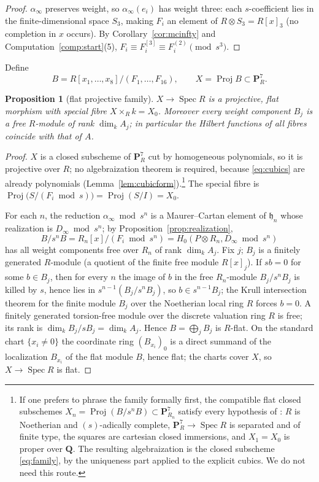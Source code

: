 \documentclass[11pt]{article}
\newtheorem{proposition}[theorem]{Proposition}
\theoremstyle{definition}
\theoremstyle{remark}
\newcommand{\QQ}{\mathbf Q}
\newcommand{\PP}{\mathbf P}
\newcommand{\Spec}{\operatorname{Spec}}
\newcommand{\Proj}{\operatorname{Proj}}
\newcommand{\h}{\mathfrak h}
\begin{document}
\begin{proof}
$\alpha_\infty$ preserves weight, so $\alpha_\infty(e_i)$ has weight three:
each $s$-coefficient lies in the finite-dimensional space $S_3$, making
$F_i$ an element of $R\otimes S_3=R[x]_3$ (no completion in $x$ occurs).
By Corollary~\ref{cor:mcinfty} and Computation~\ref{comp:start}(5),
$F_i\equiv F^{[3]}_i\equiv F^{(2)}_i\pmod{s^3}$.
\end{proof}

Define
\[
 B=R[x_1,\ldots,x_8]/(F_1,\ldots,F_{16}),
 \qquad
 X=\Proj B\subset\PP^7_R .
\tag{7.3}\label{eq:family}
\]

\begin{proposition}[flat projective family]\label{prop:flat}
$X\to\Spec R$ is a projective, flat morphism with special fibre
$X\times_Rk=X_0$.  Moreover every weight component $B_j$ is a free
$R$-module of rank $\dim_kA_j$; in particular the Hilbert functions of all
fibres coincide with that of $A$.
\end{proposition}

\begin{proof}
$X$ is a closed subscheme of $\PP^7_R$ cut by homogeneous polynomials, so
it is projective over $R$; no algebraization theorem is required, because
\eqref{eq:cubics} are already polynomials
(Lemma~\ref{lem:cubicform}).\footnote{If one prefers to phrase the family
formally first, the compatible flat closed subschemes
$X_n=\Proj(B/s^nB)\subset\PP^7_{R_n}$ satisfy every hypothesis of
\cite[Tag 0899]{Stacks0899}: $R$ is Noetherian and $(s)$-adically complete,
$\PP^7_R\to\Spec R$ is separated and of finite type, the squares are
cartesian closed immersions, and $X_1=X_0$ is proper over $\QQ$.  The
resulting algebraization is the closed subscheme \eqref{eq:family}, by the
uniqueness part applied to the explicit cubics.  We do not need this
route.}  The special fibre is
$\Proj\bigl(S/(F_i\bmod s)\bigr)=\Proj(S/I)=X_0$.

For each $n$, the reduction $\alpha_\infty\bmod s^n$ is a Maurer--Cartan
element of $\h_n$ whose realization is $D_\infty\bmod s^n$; by
Proposition~\ref{prop:realization},
\[
 B/s^nB=R_n[x]/(F_i\bmod s^n)=H_0(P\otimes R_n,D_\infty\bmod s^n)
\]
has all weight components free over $R_n$ of rank $\dim_kA_j$.  Fix $j$;
$B_j$ is a finitely generated $R$-module (a quotient of the finite free
module $R[x]_j$).  If $sb=0$ for some $b\in B_j$, then for every $n$ the
image of $b$ in the free $R_n$-module $B_j/s^nB_j$ is killed by $s$, hence
lies in $s^{n-1}(B_j/s^nB_j)$, so $b\in s^{n-1}B_j$; the Krull intersection
theorem for the finite module $B_j$ over the Noetherian local ring $R$
forces $b=0$.  A finitely generated torsion-free module over the discrete
valuation ring $R$ is free; its rank is
$\dim_k B_j/sB_j=\dim_kA_j$.  Hence $B=\bigoplus_jB_j$ is $R$-flat.  On the
standard chart $\{x_i\neq0\}$ the coordinate ring $(B_{x_i})_0$ is a direct
summand of the localization $B_{x_i}$ of the flat module $B$, hence flat;
the charts cover $X$, so $X\to\Spec R$ is flat.
\end{proof}
\end{document}

